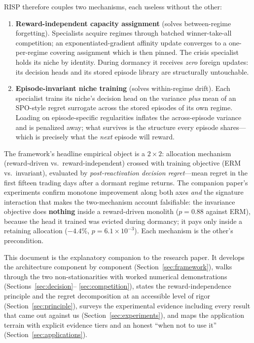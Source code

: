 \documentclass[10pt]{article}
\newcommand{\nm}{\textsc{RISP}}
\begin{document}
\nm{} therefore couples two mechanisms, each useless without the other:

\begin{enumerate}[leftmargin=1.8em]
    \item \textbf{Reward-independent capacity assignment} (solves
    between-regime forgetting). Specialists acquire regimes through
    batched winner-take-all competition; an exponentiated-gradient
    affinity update converges to a one-per-regime covering assignment
    which is then pinned. The crisis specialist holds its niche by
    identity. During dormancy it receives \emph{zero} foreign updates:
    its decision heads and its stored episode library are structurally
    untouchable.
    \item \textbf{Episode-invariant niche training} (solves within-regime
    drift). Each specialist trains its niche's decision head on the
    variance \emph{plus} mean of an SPO-style regret surrogate across
    the stored episodes of its own regime. Loading on episode-specific
    regularities inflates the across-episode variance and is penalized
    away; what survives is the structure every episode shares---which is
    precisely what the \emph{next} episode will reward.
\end{enumerate}

The framework's headline empirical object is a $2{\times}2$: allocation
mechanism (reward-driven vs.\ reward-independent) crossed with training
objective (ERM vs.\ invariant), evaluated by \emph{post-reactivation
decision regret}---mean regret in the first fifteen trading days after a
dormant regime returns. The companion paper's experiments confirm monotone
improvement along both axes \emph{and} the signature interaction that
makes the two-mechanism account falsifiable: the invariance objective does
\textbf{nothing} inside a reward-driven monolith ($p = 0.88$ against ERM),
because the head it trained was evicted during dormancy; it pays only
inside a retaining allocation ($-4.4\%$, $p = 6.1 \times 10^{-3}$). Each
mechanism is the other's precondition.

This document is the explanatory companion to the research paper. It
develops the architecture component by component
(Section~\ref{sec:framework}), walks through the two non-stationarities
with worked numerical demonstrations (Sections~\ref{sec:decision}--%
\ref{sec:competition}), states the reward-independence principle and the
regret decomposition at an accessible level of rigor
(Section~\ref{sec:principle}), surveys the experimental evidence
including every result that came out against us
(Section~\ref{sec:experiments}), and maps the application terrain with
explicit evidence tiers and an honest ``when not to use it''
(Section~\ref{sec:applications}).
\end{document}
